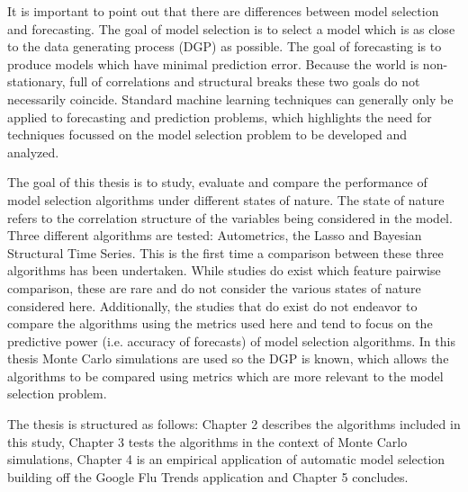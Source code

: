 It is important to point out that there are differences between model selection and forecasting. The goal of model selection is to select a model which is as close to the data generating process (DGP) as possible.  The goal of forecasting is to produce models which have minimal prediction error. Because the world is non-stationary, full of correlations and structural breaks these two goals do not necessarily coincide. Standard machine learning techniques can generally only be applied to forecasting and prediction problems, which highlights the need for techniques focussed on the model selection problem to be developed and analyzed. 

The goal of this thesis is to study, evaluate and compare the performance of model selection algorithms under different states of nature. The state of nature refers to the correlation structure of the variables being considered in the model. Three different algorithms are tested: Autometrics, the Lasso and Bayesian Structural Time Series. This is the first time a comparison between these three algorithms has been undertaken. While studies do exist which feature pairwise comparison, these are rare and do not consider the various states of nature considered here. Additionally, the studies that do exist do not endeavor to compare the algorithms using the metrics used here and tend to focus on the predictive power (i.e. accuracy of forecasts) of model selection algorithms. In this thesis Monte Carlo simulations are used so the DGP is known, which allows the algorithms to be compared using metrics which are more relevant to the model selection problem. %

The thesis is structured as follows: Chapter 2 describes the algorithms included in this study, Chapter 3 tests the algorithms in the context of Monte Carlo simulations, Chapter 4 is an empirical application of automatic model selection building off the Google Flu Trends application and Chapter 5 concludes. 


